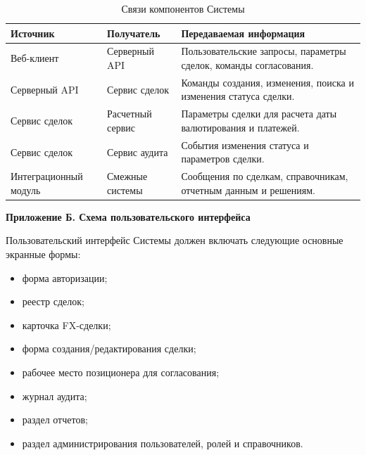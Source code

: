 \documentclass[a4paper,14pt]{extarticle}
\begin{document}
\begin{table}[H]
\centering
\small
\caption{Связи компонентов Системы}
\begin{tabularx}{\linewidth}{|L{40mm}|L{40mm}|X|}
\hline
\textbf{Источник} & \textbf{Получатель} & \textbf{Передаваемая информация} \\
\hline
Веб-клиент & Серверный API & Пользовательские запросы, параметры сделок, команды согласования. \\
\hline
Серверный API & Сервис сделок & Команды создания, изменения, поиска и изменения статуса сделки. \\
\hline
Сервис сделок & Расчетный сервис & Параметры сделки для расчета даты валютирования и платежей. \\
\hline
Сервис сделок & Сервис аудита & События изменения статуса и параметров сделки. \\
\hline
Интеграционный модуль & Смежные системы & Сообщения по сделкам, справочникам, отчетным данным и решениям. \\
\hline
\end{tabularx}
\end{table}

\newpage
\begin{center}
\textbf{Приложение Б. Схема пользовательского интерфейса}
\end{center}

Пользовательский интерфейс Системы должен включать следующие основные экранные формы:
\begin{itemize}[itemsep=1mm]
  \item форма авторизации;
  \item реестр сделок;
  \item карточка FX-сделки;
  \item форма создания/редактирования сделки;
  \item рабочее место позиционера для согласования;
  \item журнал аудита;
  \item раздел отчетов;
  \item раздел администрирования пользователей, ролей и справочников.
\end{itemize}
\end{document}
